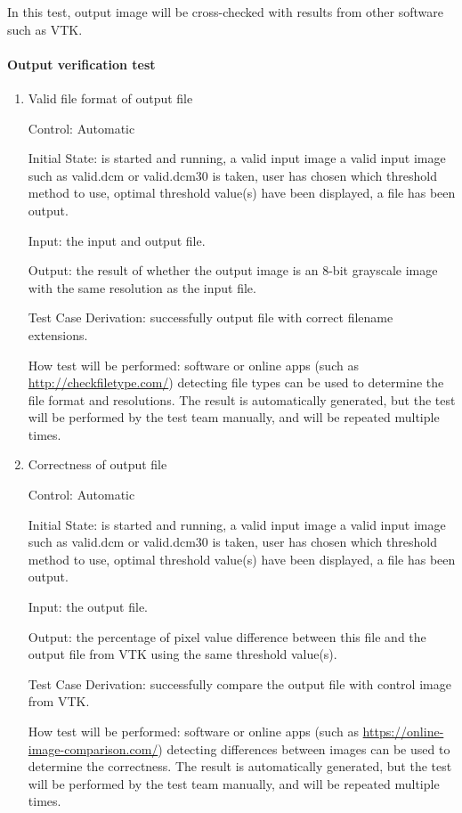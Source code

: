 \documentclass[12pt, titlepage]{article}
\begin{document}
In this test, output image will be cross-checked with results from other software such as VTK.
		
\paragraph{Output verification test}

\begin{enumerate}

\item{Valid file format of output file}

Control: Automatic
					
Initial State: \progname{} is started and running, a valid input image a valid input image such as valid.dcm or valid.dcm30 is taken, user has chosen which threshold method to use, optimal threshold value(s) have been displayed, a file has been output.
					
Input: the input and output file.
					
Output: the result of whether the output image is an 8-bit grayscale image with the same resolution as the input file.

Test Case Derivation: successfully output file with correct filename extensions.

How test will be performed: software or online apps (such as \url{http://checkfiletype.com/}) detecting file types can be used to determine the file format and resolutions. The result is automatically generated, but the test will be performed by the test team manually, and will be repeated multiple times.

\item{Correctness of output file}


Control: Automatic
					
Initial State: \progname{} is started and running, a valid input image a valid input image such as valid.dcm or valid.dcm30 is taken, user has chosen which threshold method to use, optimal threshold value(s) have been displayed, a file has been output.
					
Input: the output file.
					
Output: the percentage of pixel value difference between this file and the output file from VTK using the same threshold value(s).

Test Case Derivation: successfully compare the output file with control image from VTK.

How test will be performed: software or online apps (such as \url{https://online-image-comparison.com/}) detecting differences between images can be used to determine the correctness. The result is automatically generated, but the test will be performed by the test team manually, and will be repeated multiple times.

\end{enumerate}
\end{document}
